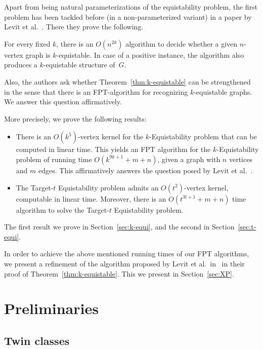 \documentclass{llncs}
\begin{document}
Apart from being natural parameterizations of the equistability problem, the
first problem has been tackled before (in a non-parameterized variant)
in a paper by Levit et al.~\cite{MR3040147}. There they prove the following.

\begin{theorem}\label{thm:k-equistable}
For every fixed $k$, there is an $O\left(n^{2k}\right)$ algorithm
to decide whether a given $n$-vertex graph is $k$-equistable.
In case of a positive instance, the algorithm also produces a $k$-equistable structure of~$G$.
\end{theorem}

Also, the authors ask whether Theorem~\ref{thm:k-equistable} can be strengthened in the sense that there is an FPT-algorithm for recognizing $k$-equistable graphs.
We answer this question affirmatively.

More precisely, we prove the following results:
\begin{itemize}
  \item There is an $O(k^5)$-vertex kernel for the {\sc $k$-Equistability} problem that can be computed in linear time.
	      This yields an FPT algorithm for the {\sc $k$-Equistability} problem of running time $O(k^{9k+1} + m + n)$, given a graph with $n$ vertices and $m$ edges. This affirmatively answers the question posed by Levit et al.~\cite{MR3040147}.
  \item The {\sc Target-$t$ Equistability} problem admits an $O(t^2)$-vertex kernel, computable in linear time.
Moreover, there is an $O(t^{3t+1} + m + n)$ time algorithm to solve the {\sc Target-$t$ Equistability} problem.
\end{itemize}
The first result we prove in Section~\ref{sec:k-equi}, and the second in Section~\ref{sec:t-equi}.

In order to achieve the above mentioned running times of our FPT algorithms, we present a refinement of the algorithm proposed
by Levit et al.~in~\cite{MR3040147} in their proof of Theorem~\ref{thm:k-equistable}. This we present in Section~\ref{sec:XP}.

\section{Preliminaries}

\subsection{Twin classes}\label{subsec:twin-classes}
\end{document}
